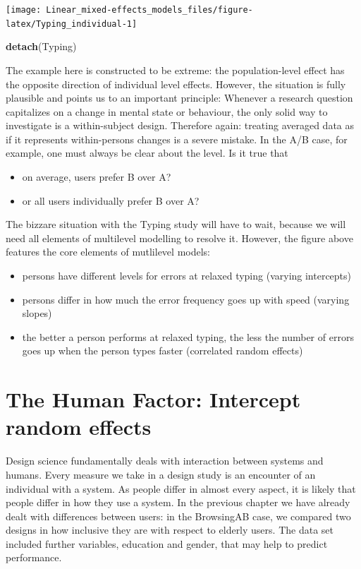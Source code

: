 \documentclass[]{svmono}
\newenvironment{Shaded}{\begin{snugshade}}{\end{snugshade}}
\newcommand{\KeywordTok}[1]{\textcolor[rgb]{0.13,0.29,0.53}{\textbf{#1}}}
\newcommand{\NormalTok}[1]{#1}
\providecommand{\tightlist}{%
  \setlength{\itemsep}{0pt}\setlength{\parskip}{0pt}}
\begin{document}
\texttt{[image: Linear\_mixed-effects\_models\_files/figure-latex/Typing\_individual-1]}

\begin{Shaded}
\begin{Highlighting}[]
\KeywordTok{detach}\NormalTok{(Typing)}
\end{Highlighting}
\end{Shaded}

The example here is constructed to be extreme: the population-level
effect has the opposite direction of individual level effects. However,
the situation is fully plausible and points us to an important
principle: Whenever a research question capitalizes on a change in
mental state or behaviour, the only solid way to investigate is a
within-subject design. Therefore again: treating averaged data as if it
represents within-persons changes is a severe mistake. In the A/B case,
for example, one must always be clear about the level. Is it true that

\begin{itemize}
\tightlist
\item
  on average, users prefer B over A?
\item
  or all users individually prefer B over A?
\end{itemize}

The bizzare situation with the Typing study will have to wait, because
we will need all elements of multilevel modelling to resolve it.
However, the figure above features the core elements of mutlilevel
models:

\begin{itemize}
\tightlist
\item
  persons have different levels for errors at relaxed typing (varying
  intercepts)
\item
  persons differ in how much the error frequency goes up with speed
  (varying slopes)
\item
  the better a person performs at relaxed typing, the less the number of
  errors goes up when the person types faster (correlated random
  effects)
\end{itemize}

\section{The Human Factor: Intercept random
effects}\label{the-human-factor-intercept-random-effects}

Design science fundamentally deals with interaction between systems and
humans. Every measure we take in a design study is an encounter of an
individual with a system. As people differ in almost every aspect, it is
likely that people differ in how they use a system. In the previous
chapter we have already dealt with differences between users: in the
BrowsingAB case, we compared two designs in how inclusive they are with
respect to elderly users. The data set included further variables,
education and gender, that may help to predict performance.
\end{document}

